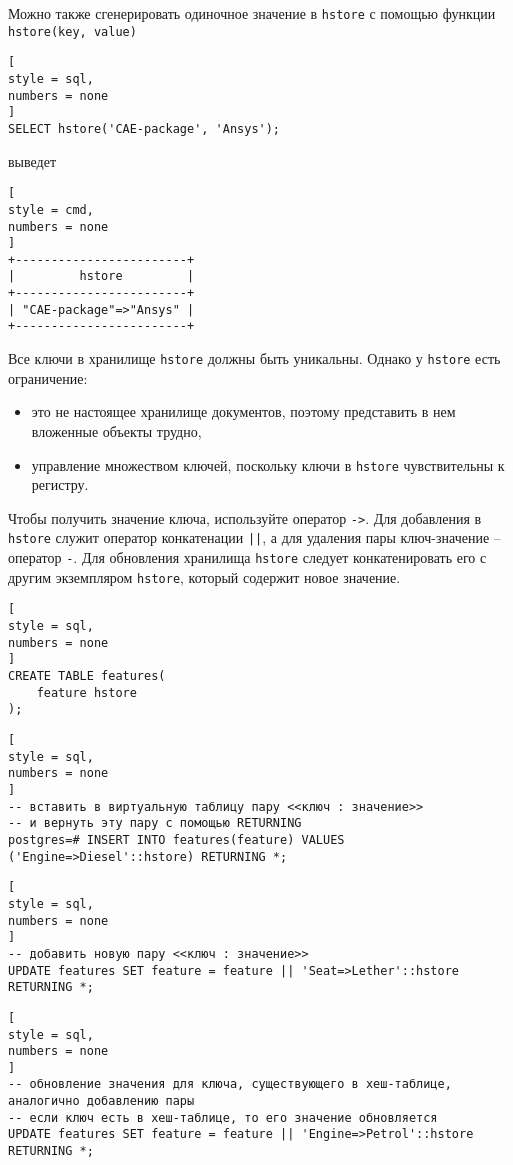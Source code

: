 \documentclass[%
	11pt,
	a4paper,
	utf8,
		]{article}
\begin{document}
Можно также сгенерировать одиночное значение в \texttt{hstore} с помощью функции \texttt{hstore(key, value)}
\begin{lstlisting}[
style = sql,
numbers = none
]
SELECT hstore('CAE-package', 'Ansys');
\end{lstlisting}
выведет
\begin{lstlisting}[
style = cmd,
numbers = none
]
+------------------------+
|         hstore         |
+------------------------+
| "CAE-package"=>"Ansys" |
+------------------------+
\end{lstlisting}

Все ключи в хранилище \texttt{hstore} должны быть уникальны. Однако у \texttt{hstore} есть ограничение:
\begin{itemize}
	\item это не настоящее хранилище документов, поэтому представить в нем вложенные объекты трудно,
	
	\item управление множеством ключей, поскольку ключи в \texttt{hstore} чувствительны к регистру.
\end{itemize}

Чтобы получить значение ключа, используйте оператор \texttt{->}. Для добавления в \texttt{hstore} служит оператор конкатенации \texttt{||}, а для удаления пары ключ-значение -- оператор \verb|-|. Для обновления хранилища \texttt{hstore} следует конкатенировать его с другим экземпляром \texttt{hstore}, который содержит новое значение.
\begin{lstlisting}[
style = sql,
numbers = none
]
CREATE TABLE features(
    feature hstore
);
\end{lstlisting}

\begin{lstlisting}[
style = sql,
numbers = none
]
-- вставить в виртуальную таблицу пару <<ключ : значение>>
-- и вернуть эту пару с помощью RETURNING
postgres=# INSERT INTO features(feature) VALUES ('Engine=>Diesel'::hstore) RETURNING *;
\end{lstlisting}

\begin{lstlisting}[
style = sql,
numbers = none
]
-- добавить новую пару <<ключ : значение>>
UPDATE features SET feature = feature || 'Seat=>Lether'::hstore RETURNING *;
\end{lstlisting}

\begin{lstlisting}[
style = sql,
numbers = none
]
-- обновление значения для ключа, существующего в хеш-таблице, аналогично добавлению пары
-- если ключ есть в хеш-таблице, то его значение обновляется
UPDATE features SET feature = feature || 'Engine=>Petrol'::hstore RETURNING *;
\end{lstlisting}
\end{document}
